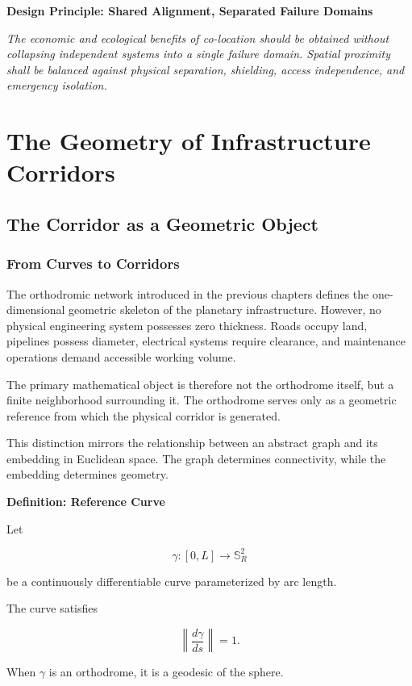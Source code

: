 \documentclass[11pt,fleqn]{book}
\numberwithin{equation}{chapter}
\newenvironment{definition}[1]
  {\begin{definitionEnv}
   \noindent\textbf{Definition: #1}\par\smallskip}
  {\end{definitionEnv}}
\newenvironment{principle}[1]
  {\begin{principleEnv}
   \noindent\textbf{Design Principle: #1}\par\smallskip\itshape}
  {\end{principleEnv}}
\theoremstyle{plain}
\theoremstyle{definition}
\theoremstyle{remark}
\newcommand{\Sphere}{\mathbb{S}^{2}}
\begin{document}
\begin{principle}{Shared Alignment, Separated Failure Domains}
The economic and ecological benefits of co-location should be obtained without collapsing independent systems into a single failure domain. Spatial proximity shall be balanced against physical separation, shielding, access independence, and emergency isolation.
\end{principle}

\part{The Geometry of Infrastructure Corridors}

\chapter{The Corridor as a Geometric Object}

\section{From Curves to Corridors}

The orthodromic network introduced in the previous chapters defines the
one-dimensional geometric skeleton of the planetary infrastructure.
However, no physical engineering system possesses zero thickness.
Roads occupy land, pipelines possess diameter, electrical systems require
clearance, and maintenance operations demand accessible working volume.

The primary mathematical object is therefore not the orthodrome itself,
but a finite neighborhood surrounding it.  The orthodrome serves only as
a geometric reference from which the physical corridor is generated.

This distinction mirrors the relationship between an abstract graph and
its embedding in Euclidean space.  The graph determines connectivity,
while the embedding determines geometry.

\begin{definition}{Reference Curve}

Let

\[
\gamma:[0,L]\rightarrow\Sphere_R
\]

be a continuously differentiable curve parameterized by arc length.

The curve satisfies

\[
\left\|
\frac{d\gamma}{ds}
\right\|
=1.
\]

When $\gamma$ is an orthodrome, it is a geodesic of the sphere.

\end{definition}
\end{document}
